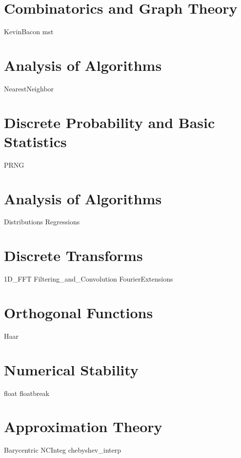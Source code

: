 \documentclass[nociteref]{SIAM-GH-book}
\begin{document}
\part{Combinatorics and Graph Theory}
{KevinBacon}
{mst}

\part{Analysis of Algorithms}
{NearestNeighbor}

\part{Discrete Probability and Basic Statistics}
{PRNG}

\part{Analysis of Algorithms}
{Distributions}
{Regressions}

\part{Discrete Transforms}
{1D_FFT}
{Filtering_and_Convolution}
{FourierExtensions}

\part{Orthogonal Functions}
{Haar}

\part{Numerical Stability}
{float}
{floatbreak}

\part{Approximation Theory}
{Barycentric}
{NCInteg}
{chebyshev_interp}
\end{document}
